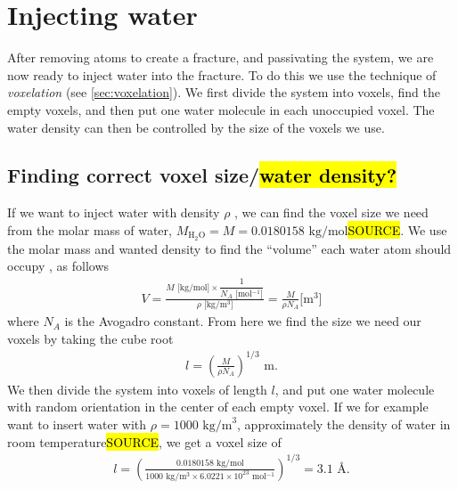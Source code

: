 \FloatBarrier
\section{Injecting water}
After removing atoms to create a fracture, and passivating the system, we are now ready to inject water into the fracture. To do this we use the technique of \emph{voxelation} (see \cref{sec:voxelation}). We first divide the system into voxels, find the empty voxels, and then put one water molecule in each unoccupied voxel. The water density can then be controlled by the size of the voxels we use.

\subsection[Finding correct voxel size/water density?]{Finding correct voxel size/\hl{water density?}}
If we want to inject water with density $\rho$%
, we can find the voxel size we need from the molar mass of water, $M_\text{H$_2$O} = M = 0.0180158 \text{ kg/mol}$\hl{SOURCE}. We use the molar mass and wanted density to find the ``volume'' each water atom should occupy%
, as follows
\begin{align*}
    V 
    = \frac{ M\text{ [kg/mol]} \times \dfrac{1}{N_A \text{ [mol$^{-1}$]}}}{ \rho\text{ [kg/m$^3$]} } 
    = \frac{M}{\rho N_A}\text{[m$^3$]}
\end{align*}
where $N_A$ is the Avogadro constant. From here we find the size we need our voxels by taking the cube root
\begin{align*}
    l = \left(\frac{M}{\rho N_A} \right)^{1/3}\text{ m}.
\end{align*}
We then divide the system into voxels of length $l$, and put one water molecule with random orientation in the center of each empty voxel. If we for example want to insert water with $\rho = 1000\text{ kg/m}^3$, approximately the density of water in room temperature\hl{SOURCE}, we get a voxel size of
\begin{align*}
    l = \left(\frac{0.0180158 \text{ kg/mol}}{1000\text{ kg/m$^3$} \times 6.0221 \times 10^{23}\text{ mol$^{-1}$}} \right)^{1/3} = 3.1 \text{ \AA}.
\end{align*}


